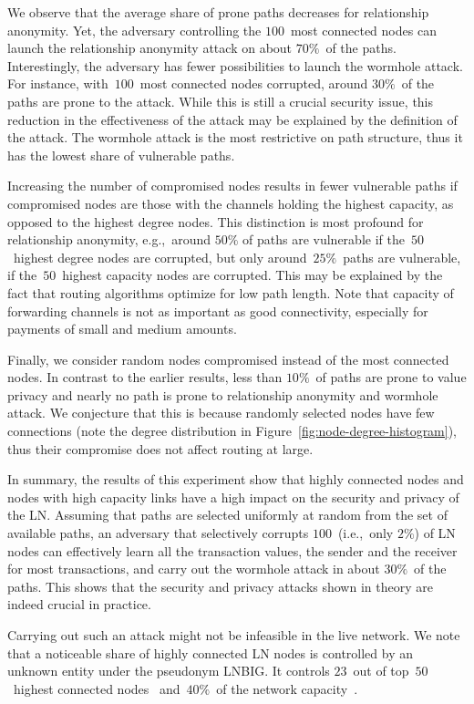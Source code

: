 We observe that the average share of prone paths decreases for relationship anonymity.
Yet, the adversary controlling the $100$~most connected nodes can launch the relationship anonymity attack on about $70\%$~of the paths.
Interestingly, the adversary has fewer possibilities to launch the wormhole attack.
For instance, with~$100$~most connected nodes corrupted, around $30\%$~of the paths are prone to the attack.
While this is still a crucial security issue, this reduction in the effectiveness of the attack may be explained by the definition of the attack.
The wormhole attack is the most restrictive on path structure, thus it has the lowest share of vulnerable paths.

Increasing the number of compromised nodes results in fewer vulnerable paths if compromised nodes are those with the channels holding the highest capacity, as opposed to the highest degree nodes.
This distinction is most profound for relationship anonymity, e.g.,~around $50\%$ of paths are vulnerable if the~$50$~highest degree nodes are corrupted, but only around~$25\%$~paths are vulnerable, if the~$50$~highest capacity nodes are corrupted.
This may be explained by the fact that routing algorithms optimize for low path length.
Note that capacity of forwarding channels is not as important as good connectivity, especially for payments of small and medium amounts.

Finally, we consider random nodes compromised instead of the most connected nodes.
In contrast to the earlier results, less than $10\%$~of paths are prone to value privacy and nearly no path is prone to relationship anonymity and wormhole attack.
We conjecture that this is because randomly selected nodes have few connections (note the degree distribution in Figure~\ref{fig:node-degree-histogram}), thus their compromise does not affect routing at large.

In summary, the results of this experiment show that highly connected nodes and nodes with high capacity links have a high impact on the security and privacy of the LN\@.
Assuming that paths are selected uniformly at random from the set of available paths, an adversary that selectively corrupts $100$~(i.e.,~only $2\%$) of LN nodes can effectively learn all the transaction values, the sender and the receiver for most transactions, and carry out the wormhole attack in about $30\%$~of the paths.
This shows that the security and privacy attacks shown in theory are indeed crucial in practice.

Carrying out such an attack might not be infeasible in the live network.
We note that a noticeable share of highly connected LN nodes is controlled by an unknown entity under the pseudonym LNBIG.
It controls $23$~out of top~$50$~highest connected nodes~\cite{1MLTopConnected} and~$40\%$~of the network capacity~\cite{TheBlockLNBIG}.



